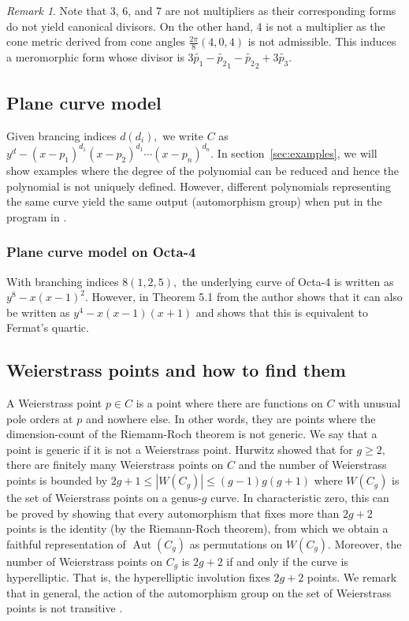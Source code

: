 \documentclass[12pt,reqno]{amsart}
\DeclareMathOperator{\Aut}{Aut}
\theoremstyle{definition}
\theoremstyle{remark}
\newtheorem*{remark}{Remark}
\begin{document}
\begin{remark} Note that 3, 6, and 7 are not multipliers as their corresponding forms do not yield canonical divisors. On the other hand, 4 is not a multiplier as the cone metric derived from cone angles $\frac{2 \pi}{8} (4, 0, 4)$ is not admissible. This induces a meromorphic form whose divisor is $3 \widetilde{p_1} - \widetilde{p_2}_1 - \widetilde{p_2}_2 + 3 \widetilde{p_3}.$ \end{remark}

\subsection{Plane curve model}
\label{subsec:polynomial} Given brancing indices $d (d_i),$ we write $C$ as $y^d - (x - p_1)^{d_1} (x - p_2)^{d_1} \cdots (x - p_n)^{d_n}.$ In section~\ref{sec:examples}, we will show examples where the degree of the polynomial can be reduced and hence the polynomial is not uniquely defined. However, different polynomials representing the same curve yield the same output (automorphism group) when put in the program in \cite{jeroen}.


\subsubsection*{Plane curve model on Octa-4}
With branching indices $8 (1, 2, 5),$ the underlying curve of Octa-4 is written as $y^8 - x (x-1)^2.$ However, in Theorem 5.1 from \cite{dami} the author shows that it can also be written as $y^4 - x (x-1) (x+1)$ and shows that this is equivalent to Fermat's quartic.

\subsection{Weierstrass points and how to find them}

A Weierstrass point $p \in C$ is a point where there are functions on $C$ with unusual pole orders at $p$ and nowhere else. In other words, they are points where the dimension-count of the Riemann-Roch theorem is not generic. We say that a point is generic if it is not a Weierstrass point. Hurwitz showed that for $g \geq 2,$ there are finitely many Weierstrass points on $C$ and the number of Weierstrass points is bounded by $2 g + 1 \leq |W(C_g)| \leq (g - 1) g (g + 1)$ where $W(C_g)$ is the set of Weierstrass points on a genus-$g$ curve. In characteristic zero, this can be proved by showing that every automorphism that fixes more than $2 g + 2$ points is the identity (by the Riemann-Roch theorem), from which we obtain a faithful representation of $\Aut(C_g)$ as permutations on $W(C_g)$. Moreover, the number of Weierstrass points on $C_g$ is $2 g + 2$ if and only if the curve is hyperelliptic. That is, the hyperelliptic involution fixes $2 g + 2$ points. We remark that in general, the action of the automorphism group on the set of Weierstrass points is not transitive \cite{sl}. 
\end{document}
